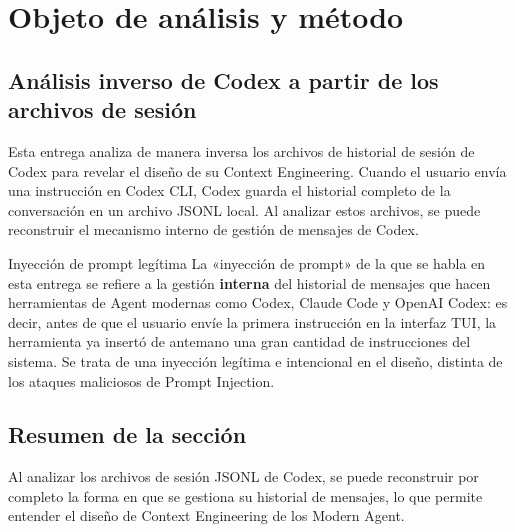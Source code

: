 \section{Objeto de análisis y método}

\subsection{Análisis inverso de Codex a partir de los archivos de sesión}

Esta entrega analiza de manera inversa los archivos de historial de sesión de Codex para revelar el diseño de su Context Engineering. Cuando el usuario envía una instrucción en Codex CLI, Codex guarda el historial completo de la conversación en un archivo JSONL local. Al analizar estos archivos, se puede reconstruir el mecanismo interno de gestión de mensajes de Codex.

\begin{importantbox}{Inyección de prompt legítima}
La «inyección de prompt» de la que se habla en esta entrega se refiere a la gestión \textbf{interna} del historial de mensajes que hacen herramientas de Agent modernas como Codex, Claude Code y OpenAI Codex: es decir, antes de que el usuario envíe la primera instrucción en la interfaz TUI, la herramienta ya insertó de antemano una gran cantidad de instrucciones del sistema. Se trata de una inyección legítima e intencional en el diseño, distinta de los ataques maliciosos de Prompt Injection.
\end{importantbox}

\subsection{Resumen de la sección}

Al analizar los archivos de sesión JSONL de Codex, se puede reconstruir por completo la forma en que se gestiona su historial de mensajes, lo que permite entender el diseño de Context Engineering de los Modern Agent.

